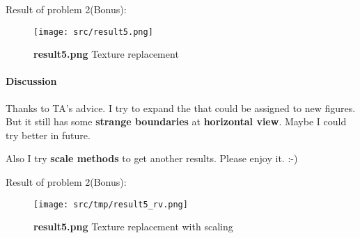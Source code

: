 Result of problem 2(Bonus): 
\begin{figure}
    \centering
    \texttt{[image: src/result5.png]}
    \caption{\textbf{result5.png} Texture replacement}
    \label{result5}
\end{figure}

\paragraph{Discussion}
Thanks to TA's advice. I try to expand the  that could be assigned to new figures.
But it still has some \textbf{strange boundaries} at \textbf{horizontal view}.
Maybe I could try better in future.

Also I try \textbf{scale methods} to get another results. Please enjoy it. :-)

Result of problem 2(Bonus): 
\begin{figure}
    \centering
    \texttt{[image: src/tmp/result5\_rv.png]}
    \caption{\textbf{result5.png} Texture replacement with scaling}
    \label{result5_rv}
\end{figure}

